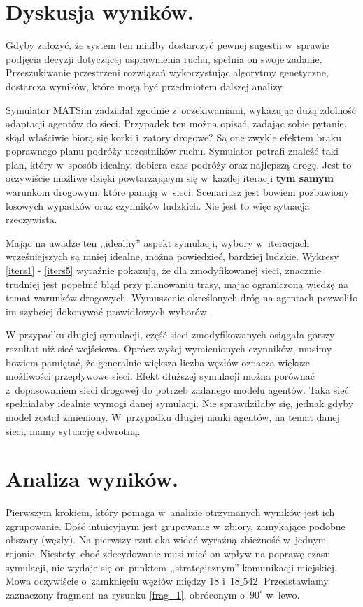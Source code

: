 \documentclass[twoside,12pt]{report}
\begin{document}
\section{Dyskusja wyników.}
Gdyby założyć, że system ten miałby dostarczyć pewnej sugestii w~sprawie podjęcia decyzji dotyczącej usprawnienia ruchu, spełnia on swoje zadanie. Przeszukiwanie przestrzeni rozwiązań wykorzystując algorytmy genetyczne, dostarcza wyników, które mogą być przedmiotem dalszej analizy.

Symulator MATSim zadziałał zgodnie z~oczekiwaniami, wykazując dużą zdolność adaptacji agentów do sieci. Przypadek ten można opisać, zadając sobie pytanie, skąd właściwie biorą się korki i~zatory drogowe? Są one zwykle efektem braku poprawnego planu podróży uczestników ruchu. Symulator potrafi znaleźć taki plan, który w~sposób idealny, dobiera czas podróży oraz najlepszą drogę. Jest to oczywiście możliwe dzięki powtarzającym się w~każdej iteracji \textbf{tym samym} warunkom drogowym, które panują w~sieci. Scenariusz jest bowiem pozbawiony losowych wypadków oraz czynników ludzkich. Nie jest to więc sytuacja rzeczywista.

Mając na uwadze ten ,,idealny'' aspekt symulacji, wybory w~iteracjach wcześniejszych są mniej idealne, można powiedzieć, bardziej ludzkie. Wykresy \ref{iters1} - \ref{iters5} wyraźnie pokazują, że dla zmodyfikowanej sieci, znacznie trudniej jest popełnić błąd przy planowaniu trasy, mając ograniczoną wiedzę na temat warunków drogowych. Wymuszenie określonych dróg na agentach pozwoliło im szybciej dokonywać prawidłowych wyborów.

W przypadku długiej symulacji, część sieci zmodyfikowanych osiągała gorszy rezultat niż sieć wejściowa. Oprócz wyżej wymienionych czynników, musimy bowiem pamiętać, że generalnie większa liczba węzłów oznacza większe możliwości przepływowe sieci. Efekt dłuższej symulacji można porównać z~dopasowaniem sieci drogowej do potrzeb zadanego modelu agentów. Taka sieć spełniałaby idealnie wymogi danej symulacji. Nie sprawdziłaby się, jednak gdyby model został zmieniony. W~przypadku długiej nauki agentów, na temat danej sieci, mamy sytuację odwrotną.

\section{Analiza wyników.}
Pierwszym krokiem, który pomaga w~analizie otrzymanych wyników jest ich zgrupowanie. Dość intuicyjnym jest grupowanie w~zbiory, zamykające podobne obszary (węzły). Na pierwszy rzut oka widać wyraźną zbieżność w~jednym rejonie. Niestety, choć zdecydowanie musi mieć on wpływ na poprawę czasu symulacji, nie wydaje się on punktem ,,strategicznym'' komunikacji miejskiej. Mowa oczywiście o~zamknięciu węzłów między $18$ i~$18\_542$. Przedstawiamy zaznaczony fragment na rysunku \ref{frag_1}, obróconym o~$90^{\circ}$ w~lewo.
\end{document}
